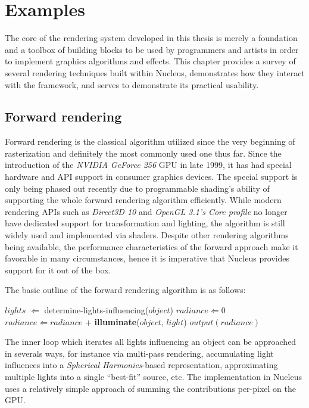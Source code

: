 
\chapter{ Examples }
\label{Chapter6}

The core of the rendering system developed in this thesis is merely a foundation and a toolbox of building blocks to be used by programmers and artists in order to implement graphics algorithms and effects. This chapter provides a survey of several rendering techniques built within Nucleus, demonstrates how they interact with the framework, and serves to demonstrate its practical usability.

\section{Forward rendering}
\label{sec:ForwardRenderingExample}

Forward rendering is the classical algorithm utilized since the very beginning of rasterization and definitely the most commonly used one thus far. Since the introduction of the \emph{NVIDIA GeForce 256} GPU in late 1999, it has had special hardware and API support in consumer graphics devices. The special support is only being phased out recently due to programmable shading's ability of supporting the whole forward rendering algorithm efficiently. While modern rendering APIs such as \emph{Direct3D 10} and \emph{OpenGL 3.1's Core profile} no longer have dedicated support for transformation and lighting, the algorithm is still widely used and implemented via shaders. Despite other rendering algorithms being available, the performance characteristics of the forward approach make it favorable in many circumstances, hence it is imperative that Nucleus provides support for it out of the box.

The basic outline of the forward rendering algorithm is as follows:
	
\begin{algorithmic}
	\STATE $lights$ $\Leftarrow$ determine-lights-influencing($object$)
	\STATE $radiance \Leftarrow 0$
		\STATE $radiance \Leftarrow radiance$ + \textbf{illuminate}($object$, $light$)
	\ENDFOR
	\STATE $output(radiance)$
\ENDFOR
\end{algorithmic}

The inner loop which iterates all lights influencing an object can be approached in severals ways, for instance via multi-pass rendering, accumulating light influences into a \emph{Spherical Harmonics}-based representation, approximating multiple lights into a single ``best-fit'' source, etc. The implementation in Nucleus uses a relatively simple approach of summing the contributions per-pixel on the GPU.

